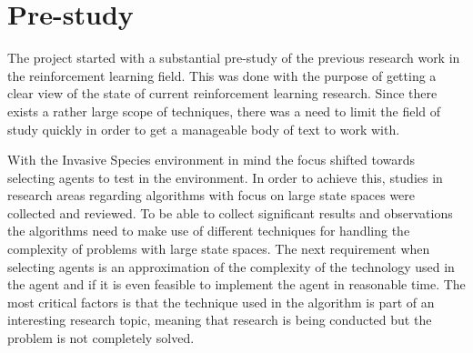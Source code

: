 \section{Pre-study }
\label{sec:pre_study}
\label{sec:select_agents}
The project started with a substantial pre-study of the previous research work in the reinforcement learning field. This was done with the purpose of getting a clear view of the state of current reinforcement learning research. Since there exists a rather large scope of techniques, there was a need to limit the field of study quickly in order to get a manageable body of text to work with. 

With the Invasive Species environment in mind the focus shifted towards selecting agents to test in the environment. In order to achieve this, studies in research areas regarding algorithms with focus on large state spaces were collected and reviewed. To be able to collect significant results and observations the algorithms need to make use of different techniques for handling the complexity of problems with large state spaces. The next requirement when selecting agents is an approximation of the complexity of the technology used in the agent and if it is even feasible to implement the agent in reasonable time. The most critical factors is that the technique used in the algorithm is part of an interesting research topic, meaning that research is being conducted but the problem is not completely solved.
